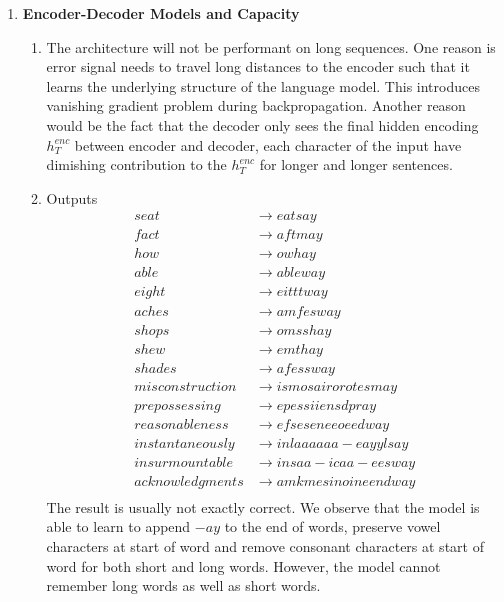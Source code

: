 \documentclass[11pt]{article}
\begin{document}
\begin{enumerate}


\item \textbf{Encoder-Decoder Models and Capacity}
\begin{enumerate}
    \item The architecture will not be performant on long sequences. One reason is error signal needs to travel long distances to the encoder such that it learns the underlying structure of the language model. This introduces vanishing gradient problem during backpropagation. Another reason would be the fact that the decoder only sees the final hidden encoding $h_T^{enc}$ between encoder and decoder, each character of the input have dimishing contribution to the $h_T^{enc}$ for longer and longer sentences.
    \item Outputs 
    \begin{align*}
        seat &\rightarrow eatsay \tag{short, starts with consonant} \\
        fact &\rightarrow aftmay \\
        how &\rightarrow owhay \\
        able &\rightarrow ableway \tag{short, starts with vowel} \\
        eight &\rightarrow eitttway \\
        aches &\rightarrow amfesway \\
        shops &\rightarrow omsshay \tag{short, starts with consonant pair} \\
        shew &\rightarrow emthay \\
        shades &\rightarrow afessway \\ 
        misconstruction &\rightarrow ismosairorotesmay \tag{long, starts with consonant} \\
        prepossessing &\rightarrow epessiiensdpray \\
        reasonableness &\rightarrow efseseneeoeedway \\
        instantaneously &\rightarrow inlaaaaaa-eayylsay \tag{long, starts with vowel} \\
        insurmountable &\rightarrow insaa-icaa-eesway \\
        acknowledgments &\rightarrow amkmesinoineendway \\
    \end{align*}
    The result is usually not exactly correct. We observe that the model is able to learn to append $-ay$ to the end of words, preserve vowel characters at start of word and remove consonant characters at start of word for both short and long words. However, the model cannot remember long words as well as short words. 
\end{enumerate}


\end{enumerate}
\end{document}
